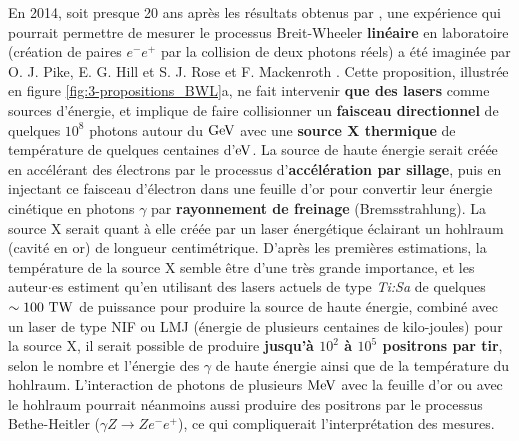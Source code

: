 \begin{refsection}
En 2014, soit presque 20 ans après les résultats obtenus par \parencite{burke_1997}, une expérience qui pourrait permettre de mesurer le processus Breit-Wheeler \textbf{linéaire} en laboratoire (création de paires $e^-e^+$ par la collision de deux photons réels) a été imaginée par O. J. Pike, E. G. Hill et S. J. Rose et F. Mackenroth \parencite{pike_2014}.
Cette proposition, illustrée en figure \ref{fig:3-propositions_BWL}a, ne fait intervenir \textbf{que des lasers} comme sources d'énergie, et implique de faire collisionner un \textbf{faisceau directionnel} de quelques $10^8$ photons autour du $\rm GeV$ avec une \textbf{source X thermique} de température de quelques centaines d'$\rm eV$. La source de haute énergie serait créée en accélérant des électrons par le processus d'\textbf{accélération par sillage}, puis en injectant ce faisceau d'électron dans une feuille d'or pour convertir leur énergie cinétique en photons $\gamma$ par \textbf{rayonnement de freinage} (Bremsstrahlung). La source X serait quant à elle créée par un laser énergétique éclairant un hohlraum (cavité en or) de longueur centimétrique. D'après les premières estimations, la température de la source X semble être d'une très grande importance, et les auteur$\cdot$es estiment qu'en utilisant des lasers actuels de type \textit{Ti:Sa} de quelques $\sim 100 ~ \rm TW$ de puissance pour produire la source de haute énergie, combiné avec un laser de type NIF ou LMJ (énergie de plusieurs centaines de kilo-joules) pour la source X, il serait possible de produire \textbf{jusqu'à $10^2$ à $10^5$ positrons par tir}, selon le nombre et l'énergie des $\gamma$ de haute énergie ainsi que de la température du hohlraum. L'interaction de photons de plusieurs $\rm MeV$ avec la feuille d'or ou avec le hohlraum pourrait néanmoins aussi produire des positrons par le processus Bethe-Heitler ($\gamma Z \to Z e^- e^+$), ce qui compliquerait l'interprétation des mesures.


\end{refsection}
